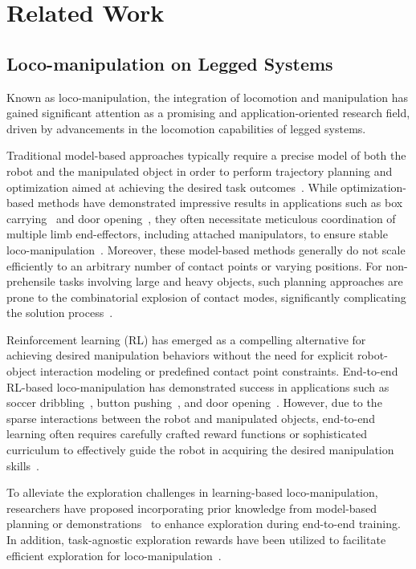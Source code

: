 \section{Related Work}
\subsection{Loco-manipulation on Legged Systems}
 Known as loco-manipulation, the integration of locomotion and manipulation has gained significant attention as a promising and application-oriented research field, driven by advancements in the locomotion capabilities of legged systems.

Traditional model-based approaches typically require a precise model of both the robot and the manipulated object in order to perform trajectory planning and optimization aimed at achieving the desired task outcomes~\cite{zimmermann2021go, murooka2015whole, rigo2023contact, polverini2020multi}.
While optimization-based methods have demonstrated impressive results in applications such as box carrying~\cite{bellicoso2019alma} and door opening~\cite{sleiman2021unified}, they often necessitate meticulous coordination of multiple limb end-effectors, including attached manipulators, to ensure stable loco-manipulation~\cite{li2023multi, lin2024locoman, schakkal2024dynamic}.
Moreover, these model-based methods generally do not scale efficiently to an arbitrary number of contact points or varying positions.
For non-prehensile tasks involving large and heavy objects, such planning approaches are prone to the combinatorial explosion of contact modes, significantly complicating the solution process~\cite{cheng2023enhancing, smith2012dual}.

Reinforcement learning (RL) has emerged as a compelling alternative for achieving desired manipulation behaviors without the need for explicit robot-object interaction modeling or predefined contact point constraints.
End-to-end RL-based loco-manipulation has demonstrated success in applications such as soccer dribbling~\cite{ji2023dribblebot, hu2024dexdribbler}, button pushing~\cite{cheng2023legs, he2024learning}, and door opening~\cite{arm2024pedipulate, schwarke2023curiosity, zhang2024learning}.
However, due to the sparse interactions between the robot and manipulated objects, end-to-end learning often requires carefully crafted reward functions or sophisticated curriculum to effectively guide the robot in acquiring the desired manipulation skills~\cite{shi2021circus, fu2023deep}.

To alleviate the exploration challenges in learning-based loco-manipulation, researchers have proposed incorporating prior knowledge from model-based planning or demonstrations~\cite{sleiman2024guided, liu2024opt2skill} to enhance exploration during end-to-end training. 
In addition, task-agnostic exploration rewards have been utilized to facilitate efficient exploration for loco-manipulation~\cite{schwarke2023curiosity, zhang2024wococo}.

